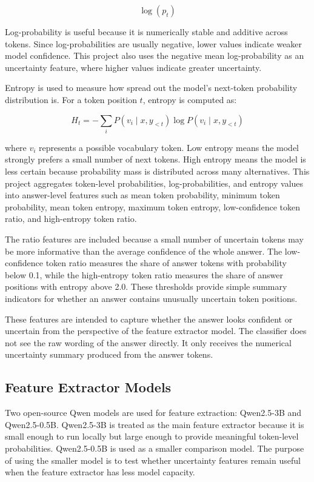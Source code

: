 \documentclass[11pt]{article}
\begin{document}
\[
\log(p_t)
\]

Log-probability is useful because it is numerically stable and additive across tokens. Since log-probabilities are usually negative, lower values indicate weaker model confidence. This project also uses the negative mean log-probability as an uncertainty feature, where higher values indicate greater uncertainty.

Entropy is used to measure how spread out the model's next-token probability distribution is. For a token position $t$, entropy is computed as:

\[
H_t = - \sum_i P(v_i \mid x, y_{<t}) \log P(v_i \mid x, y_{<t})
\]

where $v_i$ represents a possible vocabulary token. Low entropy means the model strongly prefers a small number of next tokens. High entropy means the model is less certain because probability mass is distributed across many alternatives. This project aggregates token-level probabilities, log-probabilities, and entropy values into answer-level features such as mean token probability, minimum token probability, mean token entropy, maximum token entropy, low-confidence token ratio, and high-entropy token ratio.

The ratio features are included because a small number of uncertain tokens may be more informative than the average confidence of the whole answer. The low-confidence token ratio measures the share of answer tokens with probability below 0.1, while the high-entropy token ratio measures the share of answer positions with entropy above 2.0. These thresholds provide simple summary indicators for whether an answer contains unusually uncertain token positions.

These features are intended to capture whether the answer looks confident or uncertain from the perspective of the feature extractor model. The classifier does not see the raw wording of the answer directly. It only receives the numerical uncertainty summary produced from the answer tokens.

\subsection{Feature Extractor Models}
Two open-source Qwen models are used for feature extraction: Qwen2.5-3B and Qwen2.5-0.5B. Qwen2.5-3B is treated as the main feature extractor because it is small enough to run locally but large enough to provide meaningful token-level probabilities. Qwen2.5-0.5B is used as a smaller comparison model. The purpose of using the smaller model is to test whether uncertainty features remain useful when the feature extractor has less model capacity.
\end{document}
